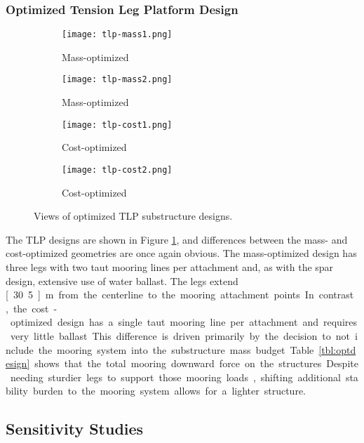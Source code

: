 \subsubsection{Optimized Tension Leg Platform Design}

\begin{figure}[htb]
  \begin{subfigure}[b]{0.24\linewidth}
    \centering \texttt{[image: tlp-mass1.png]}
    \caption{Mass-optimized}
  \end{subfigure}
  \begin{subfigure}[b]{0.24\linewidth}
    \centering \texttt{[image: tlp-mass2.png]}
    \caption{Mass-optimized}
  \end{subfigure}
  \begin{subfigure}[b]{0.24\linewidth}
    \centering \texttt{[image: tlp-cost1.png]}
    \caption{Cost-optimized}
  \end{subfigure}
  \begin{subfigure}[b]{0.24\linewidth}
    \centering \texttt{[image: tlp-cost2.png]}
    \caption{Cost-optimized}
  \end{subfigure}
  \caption{Views of optimized TLP substructure designs.}
  \label{fig:tlp-design}
\end{figure}

The TLP designs are shown in Figure \ref{fig:tlp-design}, and
differences between the mass- and cost-optimized geometries are once
again obvious.  The mass-optimized design has three legs with two taut
mooring lines per attachment and, as with the spar design, extensive use
of water ballast.  The legs extend \unit[30.5]{m} from the centerline to
the mooring attachment points.  In contrast, the cost-optimized design
has a single taut mooring line per attachment and requires very little
ballast.  This difference is driven primarily by the decision to not
include the mooring system into the substructure mass budget.  Table
\ref{tbl:optdesign} shows that the total mooring downward force on the
structures.  Despite needing sturdier legs to support those mooring
loads, shifting additional stability burden to the mooring system allows
for a lighter structure.

\subsection{Sensitivity Studies}

